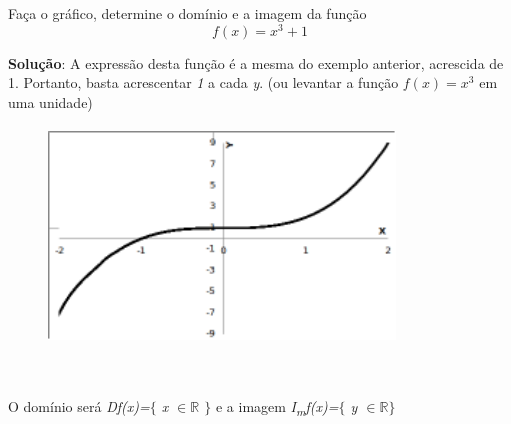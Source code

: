 \begin{texemplo}
Faça o gráfico, determine o domínio e a imagem da função $$ f ( x ) =x^{3}+1 $$

\begin{justify}
\textbf{Solução}: A expressão desta função é a mesma do exemplo anterior, acrescida de 1.
\quad Portanto, basta acrescentar \textit{1} a cada \textit{y}. (ou levantar a função  \( f \left( x \right) =x^{3} \) em uma unidade)
\end{justify}

\begin{figure}[H]
	\begin{Center}
		\includegraphics[width=3.62in,height=2.27in]{capitulos/outras_funcoes/media/image17.pdf}
	\end{Center}
\end{figure}

~~

\begin{justify}
O domínio será \textit{Df(x)=$ \{ $ x $ \in \mathbb{R} $  \textbf{ }$ \} $ } e a imagem  \textit{I\textsubscript{m}f(x)=$ \{ $ y $ \in \mathbb{R} \} $ } \qedsymbol{}
\end{justify}
\end{texemplo}

